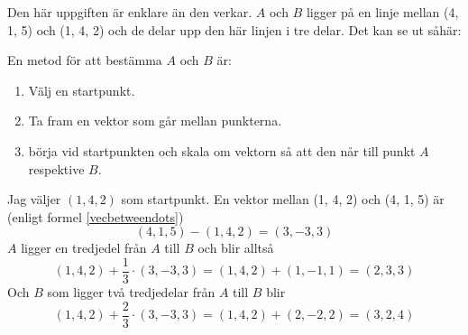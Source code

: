 \documentclass[../../main.tex]{subfiles}
\begin{document}
\begin{solution}{4}
Den här uppgiften är enklare än den verkar. $A$ och $B$ ligger på en linje mellan (4, 1, 5) och (1, 4, 2) och de delar upp den här linjen i tre delar. Det kan se ut såhär:

\begin{center}
\end{center}

En metod för att bestämma $A$ och $B$ är:
\begin{enumerate}
    \item Välj en startpunkt.
    \item Ta fram en vektor som går mellan punkterna. 
    \item börja vid startpunkten och skala om vektorn så att den når till punkt $A$ respektive $B$.
\end{enumerate}

Jag väljer $(1, 4, 2)$ som startpunkt. En vektor mellan (1, 4, 2) och (4, 1, 5) är (enligt formel \ref{vecbetweendots})
\[(4, 1, 5) - (1, 4, 2) = (3, -3, 3)\]
$A$ ligger en tredjedel från $A$ till $B$ och blir alltså
\[(1, 4, 2) + \frac{1}{3}\cdot(3, -3, 3) = (1, 4, 2) + (1, -1, 1) = (2, 3, 3)\]
Och $B$ som ligger två tredjedelar från $A$ till $B$ blir
\[(1, 4, 2) + \frac{2}{3}\cdot(3, -3, 3) = (1, 4, 2) + (2, -2, 2) = (3, 2, 4)\]

\end{solution}
\end{document}
